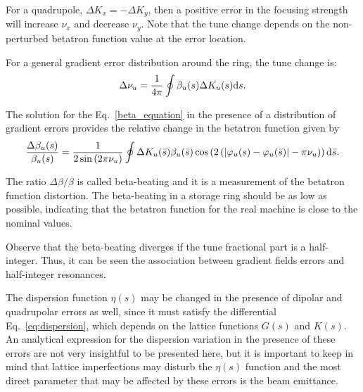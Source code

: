 For a quadrupole, $\Delta K_x = - \Delta K_y$, then a positive error in the focusing strength will increase $\nu_x$ and decrease $\nu_y$. Note that the tune change depends on the non-perturbed betatron function value at the error location.

For a general gradient error distribution around the ring, the tune change is:
\begin{equation}
    \Delta \nu_u = \dfrac{1}{4 \pi} \oint \beta_u ({s}) \Delta K_u ({s})\mathrm{d} {s}.
    \label{eq:tune_shift}
\end{equation}

The solution for the Eq.~\eqref{beta_equation} in the presence of a distribution of gradient errors provides the relative change in the betatron function given by
\begin{equation}
    \dfrac{\Delta \beta_u(s)}{\beta_u(s)} = \dfrac{1}{2\sin\left(2\pi \nu_u\right)} \oint \Delta K_u(\bar{s}) \beta_u(\bar{s}) \cos\left(2\left(|\varphi_{u}(s) - \varphi_{u}(\bar{s})| - \pi\nu_{u} \right)\right) \mathrm{d} \bar{s}.
\end{equation}

The ratio $\Delta \beta/\beta$ is called beta-beating and it is a measurement of the betatron function distortion. The beta-beating in a storage ring should be as low as possible, indicating that the betatron function for the real machine is close to the nominal values.

Observe that the beta-beating diverges if the tune fractional part is a half-integer. Thus, it can be seen the association between gradient fields errors and half-integer resonances.

The dispersion function $\eta(s)$ may be changed in the presence of dipolar and quadrupolar errors as well, since it must satisfy the differential Eq.~\eqref{eq:dispersion}, which depends on the lattice functions $G(s)$ and $K(s)$. An analytical expression for the dispersion variation in the presence of these errors are not very insightful to be presented here, but it is important to keep in mind that lattice imperfections may disturb the $\eta(s)$ function and the most direct parameter that may be affected by these errors is the beam emittance.

